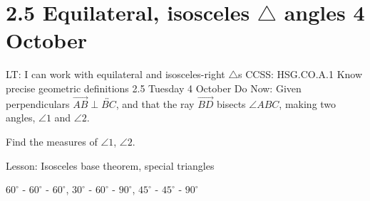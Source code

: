 \section{2.5 Equilateral, isosceles $\triangle$ angles \hfill 4 October}
\begin{frame}{LT: I can work with equilateral and isosceles-right $\triangle$s}
  {CCSS: HSG.CO.A.1 Know precise geometric definitions  \hfill \alert{2.5 Tuesday 4 October}}
  Do Now: Given perpendiculars $\overrightarrow{AB} \perp \overleftrightarrow{BC}$, and that the ray $\overrightarrow{BD}$ bisects $\angle ABC$, making two angles, $\angle 1$ and $\angle 2$. \par \medskip
  Find the measures of $\angle 1$, $\angle 2$.
  \begin{flushleft}
    \end{flushleft}
    Lesson: Isosceles base theorem, special triangles \par $60^\circ$ - $60^\circ$ - $60^\circ$, $30^\circ$ - $60^\circ$ - $90^\circ$, $45^\circ$ - $45^\circ$ - $90^\circ$
  \end{frame}


